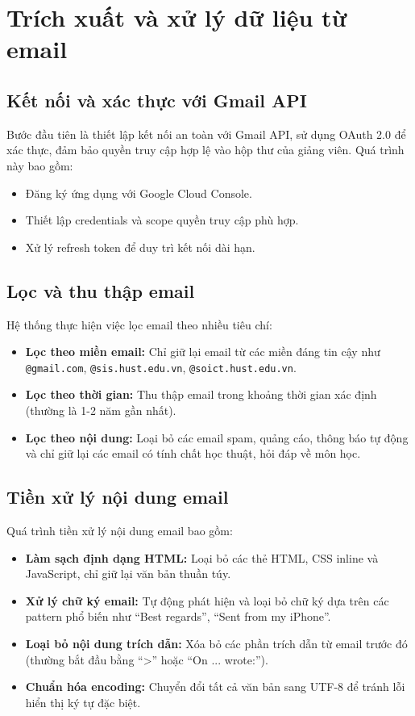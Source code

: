 \documentclass[../DoAn.tex]{subfiles}
\begin{document}
\section{Trích xuất và xử lý dữ liệu từ email}

\subsection{Kết nối và xác thực với Gmail API}
Bước đầu tiên là thiết lập kết nối an toàn với Gmail API, sử dụng OAuth 2.0 để xác thực, đảm bảo quyền truy cập hợp lệ vào hộp thư của giảng viên. Quá trình này bao gồm:
\begin{itemize}
    \item Đăng ký ứng dụng với Google Cloud Console.
    \item Thiết lập credentials và scope quyền truy cập phù hợp.
    \item Xử lý refresh token để duy trì kết nối dài hạn.
\end{itemize}

\subsection{Lọc và thu thập email}
Hệ thống thực hiện việc lọc email theo nhiều tiêu chí:
\begin{itemize}
    \item \textbf{Lọc theo miền email:} Chỉ giữ lại email từ các miền đáng tin cậy như \texttt{@gmail.com}, \texttt{@sis.hust.edu.vn}, \texttt{@soict.hust.edu.vn}.
    \item \textbf{Lọc theo thời gian:} Thu thập email trong khoảng thời gian xác định (thường là 1-2 năm gần nhất).
    \item \textbf{Lọc theo nội dung:} Loại bỏ các email spam, quảng cáo, thông báo tự động và chỉ giữ lại các email có tính chất học thuật, hỏi đáp về môn học.
\end{itemize}

\subsection{Tiền xử lý nội dung email}
Quá trình tiền xử lý nội dung email bao gồm:
\begin{itemize}
    \item \textbf{Làm sạch định dạng HTML:} Loại bỏ các thẻ HTML, CSS inline và JavaScript, chỉ giữ lại văn bản thuần túy.
    \item \textbf{Xử lý chữ ký email:} Tự động phát hiện và loại bỏ chữ ký dựa trên các pattern phổ biến như ``Best regards'', ``Sent from my iPhone''.
    \item \textbf{Loại bỏ nội dung trích dẫn:} Xóa bỏ các phần trích dẫn từ email trước đó (thường bắt đầu bằng ``>'' hoặc ``On ... wrote:'').
    \item \textbf{Chuẩn hóa encoding:} Chuyển đổi tất cả văn bản sang UTF-8 để tránh lỗi hiển thị ký tự đặc biệt.
\end{itemize}
\end{document}
